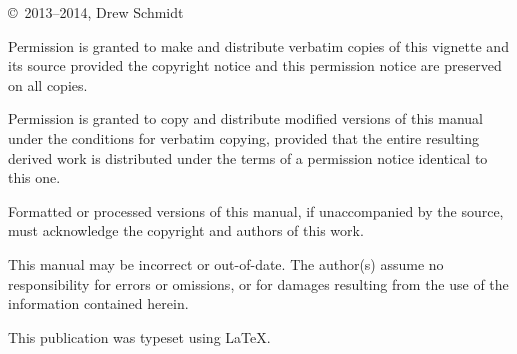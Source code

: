
\null
\vfill
\copyright\ 2013--2014, Drew Schmidt

Permission is granted to make and distribute verbatim copies of
this vignette and its source provided the copyright notice and
this permission notice are preserved on all copies.

Permission is granted to copy and distribute modified versions of
this manual under the conditions for verbatim copying, provided that
the entire resulting derived work is distributed under the terms of
a permission notice identical to this one.

Formatted or processed versions of this manual, if unaccompanied by
the source, must acknowledge the copyright and authors of this work.

This manual may be incorrect or out-of-date.  The author(s) assume
no responsibility for errors or omissions, or for damages resulting
from the use of the information contained herein.

This publication was typeset using \LaTeX.
